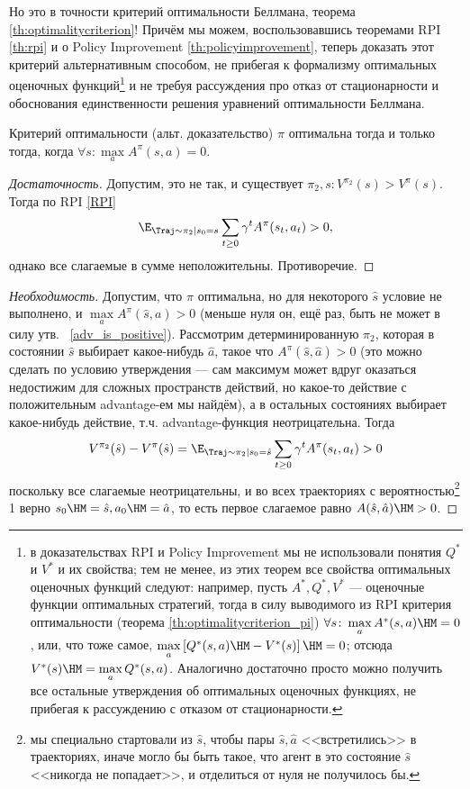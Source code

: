 Но это в точности критерий оптимальности Беллмана, теорема \ref{th:optimalitycriterion}! Причём мы можем, воспользовавшись теоремами RPI \ref{th:rpi} и о Policy Improvement \ref{th:policyimprovement}, теперь доказать этот критерий альтернативным способом, не прибегая к формализму оптимальных оценочных функций\footnote{в доказательствах RPI и Policy Improvement мы не использовали понятия $Q^*$ и $V^*$ и их свойства; тем не менее, из этих теорем все свойства оптимальных оценочных функций следуют: например, пусть $A^*, Q^*, V^*$ --- оценочные функции оптимальных стратегий, тогда в силу выводимого из RPI критерия оптимальности (теорема \ref{th:optimalitycriterion_pi}) $\forall s \colon \max\limits_a A^*(s, a) \HM= 0$, или, что тоже самое, $\max\limits_a \left[ Q^*(s, a) \HM- V^*(s) \right] \HM= 0$; отсюда $V^*(s) \HM= \max\limits_a Q^*(s, a)$. Аналогично достаточно просто можно получить все остальные утверждения об оптимальных оценочных функциях, не прибегая к рассуждению с отказом от стационарности.} и не требуя рассуждения про отказ от стационарности и обоснования единственности решения уравнений оптимальности Беллмана.

\begin{theoremBox}[label=th:optimalitycriterion_pi]{Критерий оптимальности (альт. доказательство)}
$\pi$ оптимальна тогда и только тогда, когда $\forall s \colon \max\limits_a A^\pi(s, a) = 0$.
\begin{proof}[Достаточность]
Допустим, это не так, и существует $\pi_2, s \colon V^{\pi_2}(s) > V^{\pi}(s)$. Тогда по RPI \eqref{RPI}
$$\E_{\Traj \sim \pi_2 \mid s_0 = s} \sum_{t \ge 0} \gamma^t A^{\pi}(s_t, a_t) > 0,$$
однако все слагаемые в сумме неположительны. Противоречие.
\end{proof}
\begin{proof}[Необходимость]
Допустим, что $\pi$ оптимальна, но для некоторого $\hat{s}$ условие не выполнено, и $\max\limits_{a} A^\pi(\hat{s}, a) > 0$ (меньше нуля он, ещё раз, быть не может в силу утв.~ \ref{adv_is_positive}). Рассмотрим детерминированную $\pi_2$, которая в состоянии $\hat{s}$ выбирает какое-нибудь $\hat{a}$, такое что $A^\pi(\hat{s}, \hat{a}) > 0$ (это можно сделать по условию утверждения --- сам максимум может вдруг оказаться недостижим для сложных пространств действий, но какое-то действие с положительным advantage-ем мы найдём), а в остальных состояниях выбирает какое-нибудь действие, т.ч. advantage-функция неотрицательна. Тогда  
$$V^{\pi_2}(\hat{s}) - V^{\pi}(\hat{s}) = \E_{\Traj \sim \pi_2 | s_0 = \hat{s}} \sum_{t \ge 0} \gamma^t A^{\pi}(s_t, a_t) > 0$$
поскольку все слагаемые неотрицательны, и во всех траекториях с вероятностью\footnote[*]{мы специально стартовали из $\hat{s}$, чтобы пары $\hat{s}, \hat{a}$ <<встретились>> в траекториях, иначе могло бы быть такое, что агент в это состояние $\hat{s}$ <<никогда не попадает>>, и отделиться от нуля не получилось бы.} 1 верно $s_0 \HM= \hat{s}, a_0 \HM= \hat{a}$, то есть первое слагаемое равно $A(\hat{s}, \hat{a}) \HM> 0$. 
\end{proof} 
\end{theoremBox}

